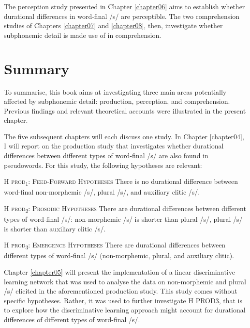 The perception study presented in Chapter \ref{chapter06} aims to establish whether durational differences in word-final /s/ are perceptible. The two comprehension studies of Chapters \ref{chapter07} and \ref{chapter08}, then, investigate whether subphonemic detail is made use of in comprehension.

\section{Summary}\label{section02_3}

To summarise, this book aims at investigating three main areas potentially affected by subphonemic detail: production, perception, and comprehension. Previous findings and relevant theoretical accounts were illustrated in the present chapter. 

The five subsequent chapters will each discuss one study. In Chapter \ref{chapter04}, I will report on the production study that investigates whether durational differences between different types of word-final /s/ are also found in pseudowords. For this study, the following hypotheses are relevant:

\begin{description}
\item\textsc{H prod\textsubscript{1}}: \textsc{Feed-Forward Hypotheses} \newline
There is no durational difference between word-final non-morphemic /s/, plural /s/, and auxiliary clitic /s/.

\item\textsc{H prod\textsubscript{2}}: \textsc{Prosodic Hypotheses} \newline
There are durational differences between different types of word-final /s/: 
non-morphemic /s/ is shorter than plural /s/, plural /s/ is shorter than auxiliary clitic /s/.

\item\textsc{H prod\textsubscript{3}}: \textsc{Emergence Hypotheses} \newline
There are durational differences between different types of word-final /s/ (non-morphemic, plural, and auxiliary clitic).
\end{description}

Chapter \ref{chapter05} will present the implementation of a linear discriminative learning network that was used to analyse the data on non-morphemic and plural /s/ elicited in the aforementioned production study. This study comes without specific hypotheses. Rather, it was used to further investigate H PROD3, that is to explore how the discriminative learning approach might account for durational differences of different types of word-final /s/.

